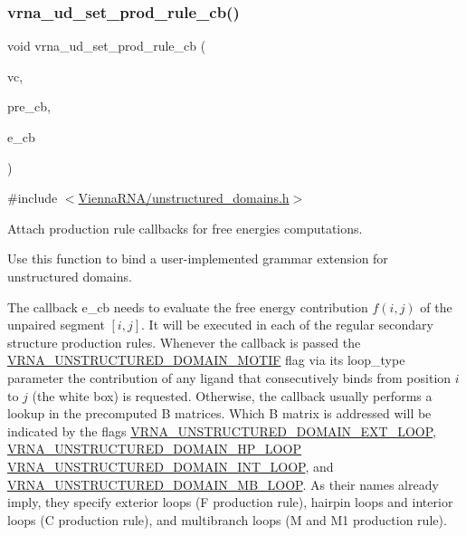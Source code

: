 \subsubsection{\texorpdfstring{vrna\_ud\_set\_prod\_rule\_cb()}{vrna\_ud\_set\_prod\_rule\_cb()}}
{\footnotesize\ttfamily void vrna\+\_\+ud\+\_\+set\+\_\+prod\+\_\+rule\+\_\+cb (\begin{DoxyParamCaption}\item[{\mbox{\hyperlink{group__fold__compound_ga1b0cef17fd40466cef5968eaeeff6166}{vrna\+\_\+fold\+\_\+compound\+\_\+t}} $\ast$}]{vc,  }\item[{\mbox{\hyperlink{group__domains__up_ga4fdfc02c1b660c07f2d887772f02a0a1}{vrna\+\_\+callback\+\_\+ud\+\_\+production}} $\ast$}]{pre\+\_\+cb,  }\item[{\mbox{\hyperlink{group__domains__up_ga75825c57d0bfde4ae4f95c044260c5c3}{vrna\+\_\+callback\+\_\+ud\+\_\+energy}} $\ast$}]{e\+\_\+cb }\end{DoxyParamCaption})}



{\ttfamily \#include $<$\mbox{\hyperlink{unstructured__domains_8h}{Vienna\+R\+N\+A/unstructured\+\_\+domains.\+h}}$>$}



Attach production rule callbacks for free energies computations. 

Use this function to bind a user-\/implemented grammar extension for unstructured domains.

The callback {\ttfamily e\+\_\+cb} needs to evaluate the free energy contribution $f(i,j)$ of the unpaired segment $[i,j]$. It will be executed in each of the regular secondary structure production rules. Whenever the callback is passed the \mbox{\hyperlink{group__domains__up_gaab12b58d59be76446a9f76fad2fe624c}{V\+R\+N\+A\+\_\+\+U\+N\+S\+T\+R\+U\+C\+T\+U\+R\+E\+D\+\_\+\+D\+O\+M\+A\+I\+N\+\_\+\+M\+O\+T\+IF}} flag via its {\ttfamily loop\+\_\+type} parameter the contribution of any ligand that consecutively binds from position $i$ to $j$ (the white box) is requested. Otherwise, the callback usually performs a lookup in the precomputed {\ttfamily B} matrices. Which {\ttfamily B} matrix is addressed will be indicated by the flags \mbox{\hyperlink{group__domains__up_gaac911374e86236a51bfd42e1f098eaba}{V\+R\+N\+A\+\_\+\+U\+N\+S\+T\+R\+U\+C\+T\+U\+R\+E\+D\+\_\+\+D\+O\+M\+A\+I\+N\+\_\+\+E\+X\+T\+\_\+\+L\+O\+OP}}, \mbox{\hyperlink{group__domains__up_ga23b610ea9564346c45cc1e2bbb62adf7}{V\+R\+N\+A\+\_\+\+U\+N\+S\+T\+R\+U\+C\+T\+U\+R\+E\+D\+\_\+\+D\+O\+M\+A\+I\+N\+\_\+\+H\+P\+\_\+\+L\+O\+OP}} \mbox{\hyperlink{group__domains__up_gac4a0feccd9654c149203200248c2716b}{V\+R\+N\+A\+\_\+\+U\+N\+S\+T\+R\+U\+C\+T\+U\+R\+E\+D\+\_\+\+D\+O\+M\+A\+I\+N\+\_\+\+I\+N\+T\+\_\+\+L\+O\+OP}}, and \mbox{\hyperlink{group__domains__up_ga67b80796655e5227a4ed662bfbe398b0}{V\+R\+N\+A\+\_\+\+U\+N\+S\+T\+R\+U\+C\+T\+U\+R\+E\+D\+\_\+\+D\+O\+M\+A\+I\+N\+\_\+\+M\+B\+\_\+\+L\+O\+OP}}. As their names already imply, they specify exterior loops ({\ttfamily F} production rule), hairpin loops and interior loops ({\ttfamily C} production rule), and multibranch loops ({\ttfamily M} and {\ttfamily M1} production rule).

